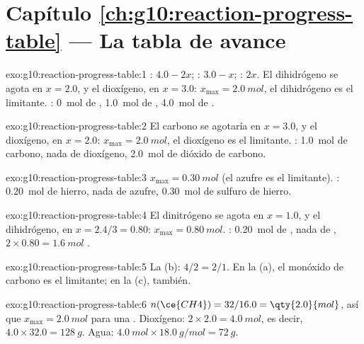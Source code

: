 \section*{Capítulo \ref{ch:g10:reaction-progress-table} --- La tabla de avance}

\begin{solution}{exo:g10:reaction-progress-table:1}
: $4.0 - 2x$; : $3.0 - x$; : $2x$. El dihidrógeno
se agota en $x = 2.0$, y el dioxígeno, en $x = 3.0$:
$x_{\max} = \qty{2.0}{mol}$, el dihidrógeno es el limitante. : \qty{0}{mol} de , \qty{1.0}{mol} de ,
\qty{4.0}{mol} de .
\end{solution}

\begin{solution}{exo:g10:reaction-progress-table:2}
El carbono se agotaría en $x = 3.0$, y el dioxígeno, en $x = 2.0$:
$x_{\max} = \qty{2.0}{mol}$, el dioxígeno es el limitante. :
\qty{1.0}{mol} de carbono, nada de dioxígeno, \qty{2.0}{mol} de dióxido
de carbono.
\end{solution}

\begin{solution}{exo:g10:reaction-progress-table:3}
$x_{\max} = \qty{0.30}{mol}$ (el azufre es el limitante). :
\qty{0.20}{mol} de hierro, nada de azufre, \qty{0.30}{mol} de sulfuro de
hierro.
\end{solution}

\begin{solution}{exo:g10:reaction-progress-table:4}
El dinitrógeno se agota en $x = 1.0$, y el dihidrógeno, en
$x = 2.4/3 = 0.80$: $x_{\max} = \qty{0.80}{mol}$. :
\qty{0.20}{mol} de , nada de
, $2 \times 0.80 = \qty{1.6}{mol}$ .
\end{solution}

\begin{solution}{exo:g10:reaction-progress-table:5}
La (b): $4/2 = 2/1$. En la (a), el monóxido de carbono es el limitante;
en la (c), también.
\end{solution}

\begin{solution}{exo:g10:reaction-progress-table:6}
$n(\ce{CH4}) = 32 / 16.0 = \qty{2.0}{mol}$, así que
$x_{\max} = \qty{2.0}{mol}$ para una . Dioxígeno:
$2 \times 2.0 = \qty{4.0}{mol}$, es decir,
$4.0 \times 32.0 = \qty{128}{g}$. Agua:
$\qty{4.0}{mol} \times \qty{18.0}{g/mol} = \qty{72}{g}$.
\end{solution}


